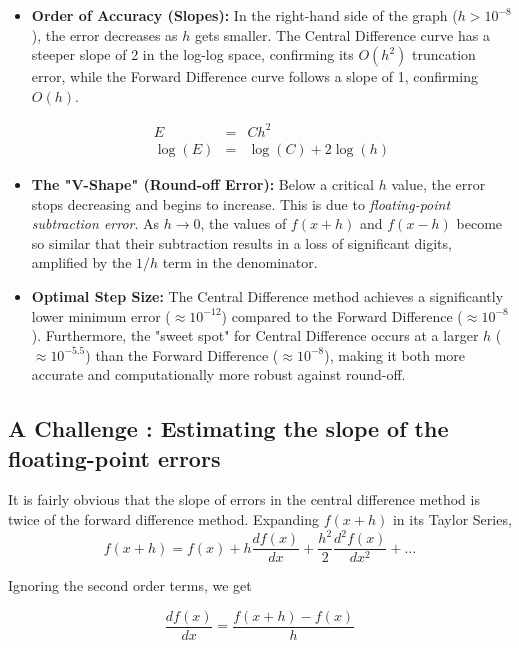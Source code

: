 \documentclass{article}
\begin{document}
\begin{itemize}
    \item \textbf{Order of Accuracy (Slopes):} In the right-hand side of the graph ($h > 10^{-8}$), the error decreases as $h$ gets smaller. The Central Difference curve has a steeper slope of 2 in the log-log space, confirming its $O(h^2)$ truncation error, while the Forward Difference curve follows a slope of 1, confirming $O(h)$.

        \begin{eqnarray}
        E & = & Ch^2 \nonumber \\
        \log(E) & = & \log(C) + 2\log(h)
        \end{eqnarray}
    
    \item \textbf{The "V-Shape" (Round-off Error):} Below a critical $h$ value, the error stops decreasing and begins to increase. This is due to \textit{floating-point subtraction error}. As $h \to 0$, the values of $f(x+h)$ and $f(x-h)$ become so similar that their subtraction results in a loss of significant digits, amplified by the $1/h$ term in the denominator.
    
    \item \textbf{Optimal Step Size:} The Central Difference method achieves a significantly lower minimum error ($\approx 10^{-12}$) compared to the Forward Difference ($\approx 10^{-8}$). Furthermore, the "sweet spot" for Central Difference occurs at a larger $h$ ($\approx 10^{-5.5}$) than the Forward Difference ($\approx 10^{-8}$), making it both more accurate and computationally more robust against round-off.

\end{itemize}

\subsection{A Challenge : Estimating the slope of the floating-point errors}

It is fairly obvious that the slope of errors in the central difference method is twice of the forward difference method. Expanding $f(x+h)$ in its Taylor Series, 
\begin{equation}
    f(x+h) = f(x) + h\frac{df(x)}{dx} + \frac{h^2}{2}\frac{d^2f(x)}{dx^2} + \dots
\end{equation}

Ignoring the second order terms, we get 

\begin{equation}
    \frac{df(x)}{dx} = \frac{f(x+h) - f(x)}{h}
\end{equation}
\end{document}
